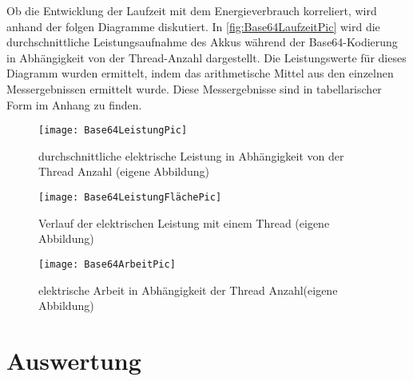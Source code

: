 Ob die Entwicklung der Laufzeit mit dem Energieverbrauch korreliert, wird anhand der folgen Diagramme diskutiert. In \autoref{fig:Base64LaufzeitPic} wird die durchschnittliche Leistungsaufnahme des Akkus während der Base64-Kodierung in Abhängigkeit von der Thread-Anzahl dargestellt. Die Leistungswerte für dieses Diagramm wurden ermittelt, indem das arithmetische Mittel aus den einzelnen Messergebnissen ermittelt wurde. Diese Messergebnisse sind in tabellarischer Form im Anhang zu finden.




\begin{figure}[h]
	\begin{center}	 
	\texttt{[image: Base64LeistungPic]}
	\caption{durchschnittliche elektrische Leistung in Abhängigkeit von der Thread Anzahl (eigene Abbildung)}
	\label{fig:Base64LeistungPic} 
	\end{center}
\end{figure}



\begin{figure}[H]
	\begin{center}	 
	\texttt{[image: Base64LeistungFlächePic]}
	\caption{Verlauf der elektrischen Leistung mit einem Thread (eigene Abbildung)}
	\label{fig:Base64LeistungFlächePic} 
	\end{center}
\end{figure}

\begin{figure}[H]
	\begin{center}	 
	\texttt{[image: Base64ArbeitPic]}
	\caption{elektrische Arbeit in Abhängigkeit der Thread Anzahl(eigene Abbildung)}
	\label{fig:Base64ArbeitPic} 
	\end{center}
\end{figure}


\section{Auswertung}